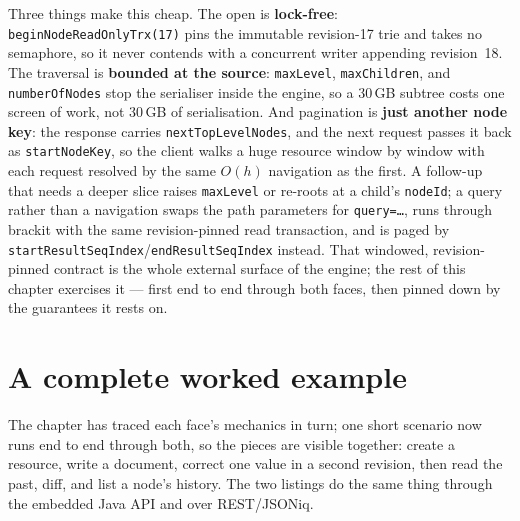 \documentclass[11pt,a4paper,oneside]{report}
\theoremstyle{sirixthm}
\newcommand{\code}[1]{\texttt{#1}}
\begin{document}
Three things make this cheap. The open is \textbf{lock-free}: \code{beginNodeReadOnlyTrx(17)} pins the
immutable revision-17 trie and takes no semaphore, so it never contends with a concurrent writer
appending revision~18. The traversal is \textbf{bounded at the source}: \code{maxLevel},
\code{maxChildren}, and \code{numberOfNodes} stop the serialiser inside the engine, so a 30\,GB subtree
costs one screen of work, not 30\,GB of serialisation. And pagination is \textbf{just another node key}:
the response carries \code{nextTopLevelNodes}, and the next request passes it back as \code{startNodeKey},
so the client walks a huge resource window by window with each request resolved by the same $O(h)$
navigation as the first. A follow-up that needs a deeper slice raises \code{maxLevel} or re-roots at a
child's \code{nodeId}; a query rather than a navigation swaps the path parameters for
\code{query=\ldots}, runs through brackit with the same revision-pinned read transaction, and is paged by
\code{startResultSeqIndex}/\allowbreak\code{endResultSeqIndex} instead. That windowed, revision-pinned
contract is the whole external surface of the engine; the rest of this chapter exercises it --- first end
to end through both faces, then pinned down by the guarantees it rests on.

\section{A complete worked example}
\label{app:session}

The chapter has traced each face's mechanics in turn; one short scenario now runs end to end through both,
so the pieces are visible together: create a resource, write a document, correct one value in a second
revision, then read the past, diff, and list a node's history. The two listings do the same thing through
the embedded Java API and over REST/JSONiq.
\end{document}
